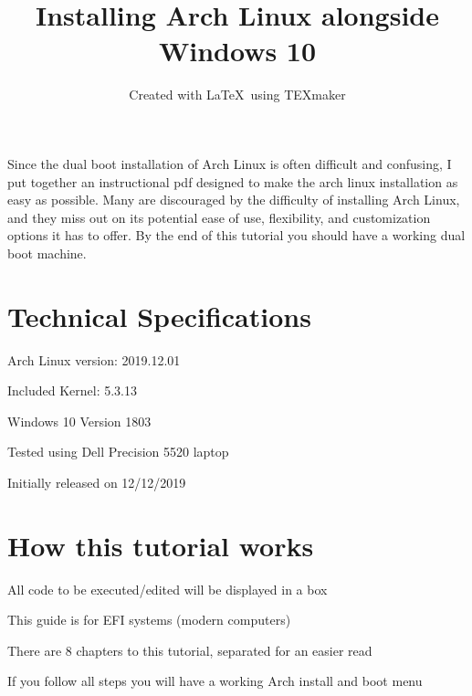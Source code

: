 \documentclass[12pt]{article}
\begin{document}
\title{Installing Arch Linux alongside Windows 10} \color{green}
\author{Created with \LaTeX\  using TEXmaker}
\maketitle

\noindent \color{white}
Since the dual boot installation of Arch Linux is often difficult and confusing, I put together an instructional pdf designed to make the arch linux installation as easy as possible. Many are discouraged by the difficulty of installing Arch Linux, and they miss out on its potential ease of use, flexibility, and customization options it has to offer. By the end of this tutorial you should have a working dual boot machine.

\color{pink}
\section*{Technical Specifications} \color{white}
\begin{adjustwidth}{0.5cm}{}
\begin{description}[font=$\bullet$~\normalfont\scshape\color{green}] \color{white}
\item Arch Linux version: 2019.12.01
\item Included Kernel: 5.3.13
\item Windows 10 Version 1803
\item Tested using Dell Precision 5520 laptop
\item Initially released on 12/12/2019

\end{description}
\end{adjustwidth}

\color{pink}
\section*{How this tutorial works} \color{white}

\begin{adjustwidth}{0.5cm}{} %


\begin{description}[font=$\bullet$~\normalfont\scshape\color{green}]
\item All code to be executed/edited will be displayed in a box
\item This guide is for EFI systems (modern computers)
\item There are 8 chapters to this tutorial, separated for an easier read
\item If you follow all steps you will have a working Arch install and boot menu
\end{description}

\end{adjustwidth}
\end{document}
